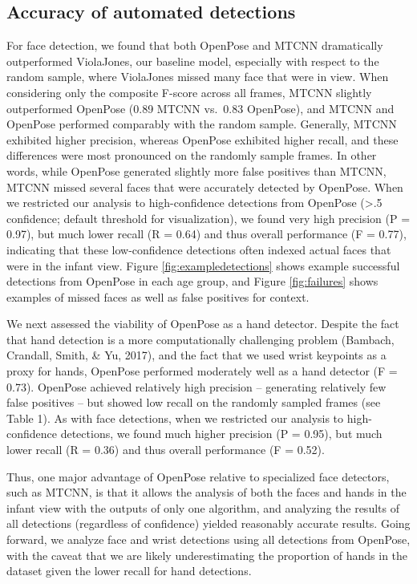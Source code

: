 \documentclass[english,man]{apa6}
\begin{document}
\subsection{Accuracy of automated
detections}\label{accuracy-of-automated-detections}

For face detection, we found that both OpenPose and MTCNN dramatically
outperformed ViolaJones, our baseline model, especially with respect to
the random sample, where ViolaJones missed many face that were in view.
When considering only the composite F-score across all frames, MTCNN
slightly outperformed OpenPose (0.89 MTCNN vs.~0.83 OpenPose), and MTCNN
and OpenPose performed comparably with the random sample. Generally,
MTCNN exhibited higher precision, whereas OpenPose exhibited higher
recall, and these differences were most pronounced on the randomly
sample frames. In other words, while OpenPose generated slightly more
false positives than MTCNN, MTCNN missed several faces that were
accurately detected by OpenPose. When we restricted our analysis to
high-confidence detections from OpenPose (\textgreater{}.5 confidence;
default threshold for visualization), we found very high precision (P =
0.97), but much lower recall (R = 0.64) and thus overall performance (F
= 0.77), indicating that these low-confidence detections often indexed
actual faces that were in the infant view. Figure
\ref{fig:exampledetections} shows example successful detections from
OpenPose in each age group, and Figure \ref{fig:failures} shows examples
of missed faces as well as false positives for context.

We next assessed the viability of OpenPose as a hand detector. Despite
the fact that hand detection is a more computationally challenging
problem (Bambach, Crandall, Smith, \& Yu, 2017), and the fact that we
used wrist keypoints as a proxy for hands, OpenPose performed moderately
well as a hand detector (F = 0.73). OpenPose achieved relatively high
precision -- generating relatively few false positives -- but showed low
recall on the randomly sampled frames (see Table 1). As with face
detections, when we restricted our analysis to high-confidence
detections, we found much higher precision (P = 0.95), but much lower
recall (R = 0.36) and thus overall performance (F = 0.52).

Thus, one major advantage of OpenPose relative to specialized face
detectors, such as MTCNN, is that it allows the analysis of both the
faces and hands in the infant view with the outputs of only one
algorithm, and analyzing the results of all detections (regardless of
confidence) yielded reasonably accurate results. Going forward, we
analyze face and wrist detections using all detections from OpenPose,
with the caveat that we are likely underestimating the proportion of
hands in the dataset given the lower recall for hand detections.
\end{document}
